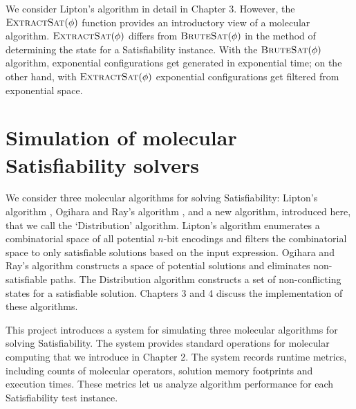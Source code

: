 We consider Lipton's algorithm in detail in Chapter 3.  However, the $\text{\sc ExtractSat}(\phi)$ function provides an introductory view of a molecular algorithm.  $\text{\sc ExtractSat}(\phi)$ differs from $\text{\sc BruteSat}(\phi)$ in the method of determining the state for a {\sc Satisfiability} instance.  With the $\text{\sc BruteSat}(\phi)$ algorithm, exponential configurations get generated in exponential time; on the other hand, with $\text{\sc ExtractSat}(\phi)$ exponential configurations get filtered from exponential space.  

				
\section{Simulation of molecular {\sc Satisfiability} solvers}
	

We consider three molecular algorithms for solving {\sc Satisfiability}: Lipton's algorithm \cite{Lipton95usingdna}, Ogihara and Ray's algorithm \cite{Ogihara:1996:BFS:898228, Ogihara97dna-basedparallel}, and a new algorithm, introduced here, that we call the `Distribution' algorithm.  Lipton's algorithm enumerates a combinatorial space of all potential $n$-bit encodings and filters the combinatorial space to only satisfiable solutions based on the input expression.  Ogihara and Ray's algorithm constructs a space of potential solutions and eliminates non-satisfiable paths.  The Distribution algorithm constructs a set of non-conflicting states for a satisfiable solution.  Chapters 3 and 4 discuss the implementation of these algorithms.

This project introduces a system for simulating three molecular algorithms for solving {\sc Satisfiability}.  The system provides standard operations for molecular computing that we introduce in Chapter 2.  The system records runtime metrics, including counts of molecular operators, solution memory footprints and execution times.  These metrics let us analyze algorithm performance for each {\sc Satisfiability} test instance.

